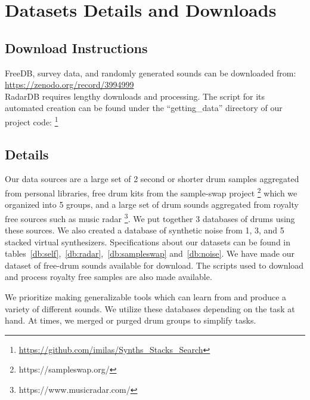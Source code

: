 \documentclass[\main/thesis.tex]{subfiles}
\begin{document}
\chapter{Datasets Details and Downloads}
\label{appendix:datasets}
\section{Download Instructions}
FreeDB, survey data, and randomly generated sounds can be downloaded from: \url{https://zenodo.org/record/3994999}\\
RadarDB requires lengthy downloads and processing. The script for its automated creation can be found under the \enquote{getting\_data} directory of our project code: \footnote{\url{https://github.com/imilas/Synths_Stacks_Search}}
\section{Details}
Our data sources are a large set of 2 second or shorter drum samples aggregated from personal libraries, free drum kits from the sample-swap project \footnote{https://sampleswap.org/} which we organized into 5 groups, and a large set of drum sounds aggregated from royalty free sources such as music radar \footnote{https://www.musicradar.com/}. We put together 3 databases of drums using these sources. We also created a database of synthetic noise from 1, 3, and 5 stacked virtual synthesizers. Specifications about our datasets can be found in tables~\ref{db:self},~\ref{db:radar},~\ref{db:sampleswap} and~\ref{db:noise}. We have made our dataset of free-drum sounds available for download. The scripts used to download and process royalty free samples are also made available. 

We prioritize making generalizable tools which can learn from and produce a variety of different sounds. We utilize these databases depending on the task at hand. At times, we merged or purged drum groups to simplify tasks.
\begin{table}[]
\centering
\caption{Database 1: Mixed sources}
\label{db:self}
\end{table}
\end{document}
